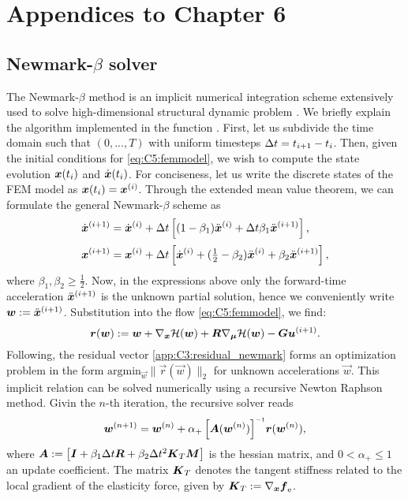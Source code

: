 \chapter{Appendices to Chapter 6}
\vspace{-10mm}
\section{Newmark-$\beta$ solver}
\label{app:C5:newmark}
The Newmark-$\beta$ method is an implicit numerical integration scheme extensively used to solve high-dimensional structural dynamic problem \cite{Newmark1959Jul,Holzapfel2002}. We briefly explain the algorithm implemented in the function . First, let us subdivide the time domain such that $(0,...,T)$ with uniform timesteps $\Delta t = t_{i+1} - t_i$. Then, given the initial conditions for \eqref{eq:C5:femmodel}, we wish to compute the state evolution ${\boldsymbol{x}}(t_i)$ and $\dot{{\boldsymbol{x}}}(t_i)$. For conciseness, let us write the discrete states of the FEM model as ${\boldsymbol{x}}(t_i) = {\boldsymbol{x}}^{(i)}$. Through the extended mean value theorem, we can formulate the general Newmark-$\beta$ scheme as
%
\begin{align}
    {\dot{\boldsymbol{x}}}^{(i+1)} & = {\dot{\boldsymbol{x}}}^{(i)} + \Delta t \left[(1-\beta_1)\ddot{\boldsymbol{x}}^{(i)} + \Delta t \beta_1 \ddot{\boldsymbol{x}}^{(i+1)} \right],                        \\[0.2em]
    {{\boldsymbol{x}}}^{(i+1)}  & = {\boldsymbol{x}}^{(i)} + \Delta t\left[ \dot{\boldsymbol{x}}^{(i)} + (\tfrac{1}{2}-\beta_2)\ddot{\boldsymbol{x}}^{(i)} + \beta_2 \ddot{\boldsymbol{x}}^{(i+1)} \right],
\end{align}
%
where $\beta_1,\beta_2 \ge \frac{1}{2}$. Now, in the expressions above only the forward-time acceleration $\ddot{\boldsymbol{x}}^{(i+1)}$ is the unknown partial solution, hence we conveniently write $\boldsymbol{w} := \ddot{{\boldsymbol{x}}}^{(i+1)}$. Substitution into the flow \eqref{eq:C5:femmodel}, we find:
%
\begin{equation}
\boldsymbol{r}(\boldsymbol{w}): = \boldsymbol{w} +\nabla_{{\boldsymbol{x}}}\mathcal{H}(\boldsymbol{w}) + \boldsymbol{R}\nabla_{\boldsymbol{\mu}}\mathcal{H}(\boldsymbol{w}) -  \boldsymbol{G}\boldsymbol{u}^{(i+1)}.
\label{app:C3:residual_newmark}
\end{equation}
%
Following, the residual vector \eqref{app:C3:residual_newmark} forms an optimization problem in the form $\text{argmin}_{\vec{w}} \lVert \vec{r}(\vec{w}) \rVert_2$ for unknown accelerations $\vec{w}$. This implicit relation can be solved numerically using a recursive Newton Raphson method. Givin the $n$-th iteration, the recursive solver reads
%
\begin{equation}
    \vec{w}^{(n+1)} = \vec{w}^{(n)} + \alpha_+ \left[ \mat{A}(\vec{w}^{(n)}) \right]\inv\! \vec{r}(\vec{w}^{(n)}),
    \label{eq:C3:newmark_newtonsolver}
\end{equation}
%
where ${\boldsymbol{A}} := \left[{\boldsymbol{I}} + \beta_1 \Delta t {\boldsymbol{R}}  + \beta_2 \Delta t^2 \boldsymbol{K}_{T}{\boldsymbol{M}}\right]$ is the hessian matrix, and $0< \alpha_+ \le 1$ an update coefficient. The matrix $\boldsymbol{K}_T$ denotes the tangent stiffness related to the local gradient of the elasticity force, given by ${\boldsymbol{K}}_T := \nabla_{{\boldsymbol{x}}} {\boldsymbol{f}}_{\scriptstyle\textrm{e}}$.